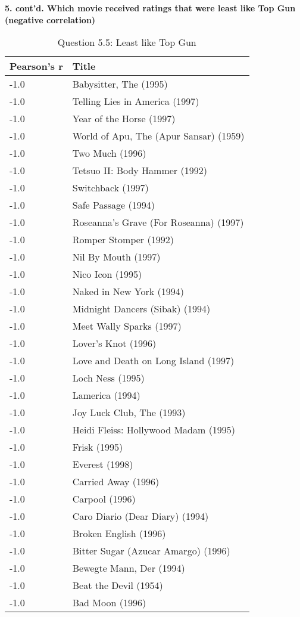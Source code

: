 \clearpage

\textbf{5. cont'd. Which movie received ratings that were least like Top Gun (negative correlation)}\\

\begin{table}[h!]
\centering
\begin{tabular}{| l | l |}
\hline
Pearson's r & Title \\
\hline
-1.0 & Babysitter, The (1995) \\
-1.0 & Telling Lies in America (1997) \\
-1.0 & Year of the Horse (1997) \\
-1.0 & World of Apu, The (Apur Sansar) (1959) \\
-1.0 & Two Much (1996) \\
-1.0 & Tetsuo II: Body Hammer (1992) \\
-1.0 & Switchback (1997) \\
-1.0 & Safe Passage (1994) \\
-1.0 & Roseanna's Grave (For Roseanna) (1997) \\
-1.0 & Romper Stomper (1992) \\
-1.0 & Nil By Mouth (1997) \\
-1.0 & Nico Icon (1995) \\
-1.0 & Naked in New York (1994) \\
-1.0 & Midnight Dancers (Sibak) (1994) \\
-1.0 & Meet Wally Sparks (1997) \\
-1.0 & Lover's Knot (1996) \\
-1.0 & Love and Death on Long Island (1997) \\
-1.0 & Loch Ness (1995) \\
-1.0 & Lamerica (1994) \\
-1.0 & Joy Luck Club, The (1993) \\
-1.0 & Heidi Fleiss: Hollywood Madam (1995)  \\
-1.0 & Frisk (1995) \\
-1.0 & Everest (1998) \\
-1.0 & Carried Away (1996) \\
-1.0 & Carpool (1996) \\
-1.0 & Caro Diario (Dear Diary) (1994) \\
-1.0 & Broken English (1996) \\
-1.0 & Bitter Sugar (Azucar Amargo) (1996) \\
-1.0 & Bewegte Mann, Der (1994) \\
-1.0 & Beat the Devil (1954) \\
-1.0 & Bad Moon (1996) \\
\hline
\end{tabular}
\caption{Question 5.5: Least like Top Gun}
\label{tab:lltg}
\end{table}

